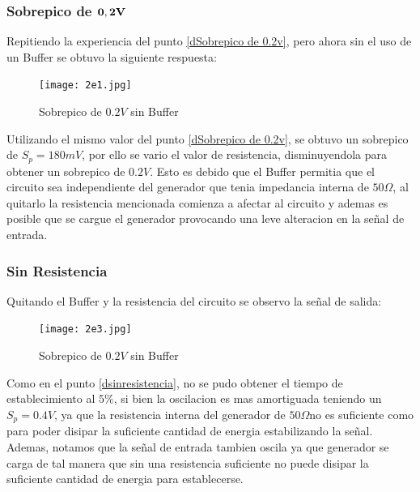 \subsubsection{Sobrepico de $\bold{0,2V}$} 

Repitiendo la experiencia del punto \ref{dSobrepico de 0.2v}, pero ahora sin el uso de un Buffer se obtuvo la siguiente respuesta:

\begin{figure}[h!]
\centering
\texttt{[image: 2e1.jpg]}
\caption{Sobrepico de $0.2V$ sin Buffer} 	
\label{fig:LRC2e1}
\end{figure}

Utilizando el mismo valor del punto \ref{dSobrepico de 0.2v}, se obtuvo un sobrepico de $S_p = 180mV$, por ello se vario el valor de resistencia, disminuyendola para obtener un sobrepico de $0.2V$. Esto es debido que el Buffer permitia que el circuito sea independiente del generador que tenia impedancia interna de $50\Omega$, al quitarlo la resistencia mencionada comienza a afectar al circuito y ademas es posible que se cargue el generador provocando una leve alteracion en la señal de entrada.

\subsubsection{Sin Resistencia}

Quitando el Buffer y la resistencia del circuito se observo la señal de salida:

\begin{figure}[h!]
\centering
\texttt{[image: 2e3.jpg]}
\caption{Sobrepico de $0.2V$ sin Buffer} 	
\label{fig:LRC2e3}
\end{figure}

Como en el punto \ref{dsinresistencia}, no se pudo obtener el tiempo de establecimiento al $5\%$, si bien la oscilacion es mas amortiguada teniendo un $S_p = 0.4V$, ya que la resistencia interna del generador de $50\Omega$no es suficiente como para poder disipar la suficiente cantidad de energia estabilizando la señal. Ademas, notamos que la señal de entrada tambien oscila ya que generador se carga de tal manera que sin una resistencia suficiente no puede disipar la suficiente cantidad de energia para establecerse.


